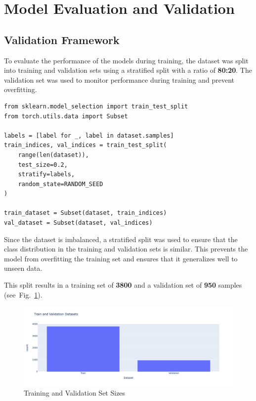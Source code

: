 \section{Model Evaluation and Validation}

\subsection{Validation Framework}

To evaluate the performance of the models during training, the dataset was split into training and validation sets using a stratified split with a ratio of \textbf{80:20}. The validation set was used to monitor performance during training and prevent overfitting.

\begin{minipage}{0.9\linewidth}\begin{lstlisting}[caption={Stratified split of the dataset into training and validation sets.},label={lst-train-vald-split}]
from sklearn.model_selection import train_test_split
from torch.utils.data import Subset

labels = [label for _, label in dataset.samples]
train_indices, val_indices = train_test_split(
    range(len(dataset)),
    test_size=0.2,
    stratify=labels,
    random_state=RANDOM_SEED
)

train_dataset = Subset(dataset, train_indices)
val_dataset = Subset(dataset, val_indices)
\end{lstlisting}\end{minipage}

Since the dataset is imbalanced, a stratified split was used to ensure that the class distribution in the training and validation sets is similar. This prevents the model from overfitting the training set and ensures that it generalizes well to unseen data.

This split results in a training set of \textbf{3800} and a validation set of \textbf{950} samples (see~Fig.~\ref{fig:train-vald-split}).

\begin{figure}[htbp]
    \centerline{\includegraphics[width=0.9\linewidth]{../../resources/train_vald_split.png}}
    \caption{Training and Validation Set Sizes}
    \label{fig:train-vald-split}
\end{figure}

